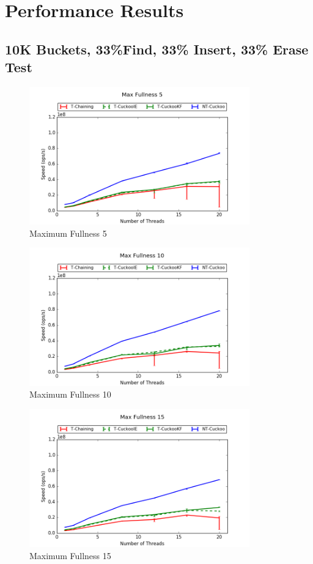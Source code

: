 \section{Performance Results}

\subsection{10K Buckets, 33\%Find, 33\% Insert, 33\% Erase Test}
\begin{figure}[H]
    \centering
	\includegraphics[width=0.85\textwidth]{maps/5HM10K:F34,I33,E33.png} 
        \caption*{Maximum Fullness 5}
    \end{figure}
\begin{figure}[H]
    \centering
	\includegraphics[width=0.85\textwidth]{maps/10HM10K:F34,I33,E33.png} 
        \caption*{Maximum Fullness 10}
    \end{figure}
\begin{figure}[H]
    \centering
	\includegraphics[width=0.85\textwidth]{maps/15HM10K:F34,I33,E33.png} 
        \caption*{Maximum Fullness 15}
    \end{figure}

